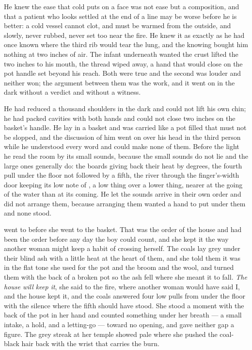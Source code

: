 He knew the ease that cold puts on a face was not ease but a composition, and that a patient who looks settled at the end of a line may be worse before he is better: a cold vessel cannot clot, and must be warmed from the outside, and slowly, never rubbed, never set too near the fire. He knew it as exactly as he had once known where the third rib would tear the lung, and the knowing bought him nothing at two inches of air. The infant underneath wanted the crust lifted the two inches to his mouth, the thread wiped away, a hand that would close on the pot handle set beyond his reach. Both were true and the second was louder and neither won; the argument between them was the work, and it went on in the dark without a verdict and without a witness.

He had reduced a thousand shoulders in the dark and could not lift his own chin; he had packed cavities with both hands and could not close two inches on the basket's handle. He lay in a basket and was carried like a pot filled that must not be slopped, and the discussion of him went on over his head in the third person while he understood every word and could make none of them. Before the light he read the room by its small sounds, because the small sounds do not lie and the large ones generally do: the boards giving back their heat by degrees, the fourth pull under the floor not followed by a fifth, the river through the finger's-width door keeping its low note of , a low thing over a lower thing, nearer at the going of the water than at its coming. He let the sounds arrive in their own order and did not arrange them, because arranging them wanted a hand to put under them and none stood.

\scenebreak

 went to  before she went to the basket. That was the order of the house and had been the order before any day the boy could count, and she kept it the way another woman might keep a habit of crossing herself. The coals lay grey under their blind ash with a little heat at the heart of them, and she told them it was  in the flat tone she used for the pot and the broom and the wool, and turned them with the back of a broken pot so the ash fell where she meant it to fall. \emph{The house will keep it}, she said to the fire, where another woman would have said I, and the house kept it, and the coals answered four low pulls from under the floor with the silence where the fifth should have stood. She stood a moment with the back of the pot in her hand and counted something under her breath --- a small intake, a hold, and a letting-go --- toward no opening, and gave neither gap a figure. The grey streak at her temple showed pale where she pushed the coal-black hair back with the wrist that carries the burn.

